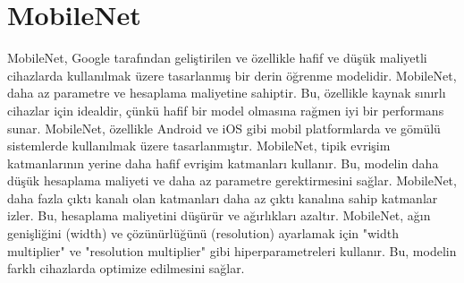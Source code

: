 \section{MobileNet}
MobileNet, Google tarafından geliştirilen ve özellikle hafif ve düşük maliyetli cihazlarda kullanılmak üzere tasarlanmış bir derin öğrenme modelidir.  MobileNet, daha az parametre ve hesaplama maliyetine sahiptir. Bu, özellikle kaynak sınırlı cihazlar için idealdir, çünkü hafif bir model olmasına rağmen iyi bir performans sunar. MobileNet, özellikle Android ve iOS gibi mobil platformlarda ve gömülü sistemlerde kullanılmak üzere tasarlanmıştır. MobileNet, tipik evrişim katmanlarının yerine daha hafif evrişim katmanları kullanır. Bu, modelin daha düşük hesaplama maliyeti ve daha az parametre gerektirmesini sağlar. MobileNet, daha fazla çıktı kanalı olan katmanları daha az çıktı kanalına sahip katmanlar izler. Bu, hesaplama maliyetini düşürür ve ağırlıkları azaltır. MobileNet, ağın genişliğini (width) ve çözünürlüğünü (resolution) ayarlamak için "width multiplier" ve "resolution multiplier" gibi hiperparametreleri kullanır. Bu, modelin farklı cihazlarda optimize edilmesini sağlar.

\newpage